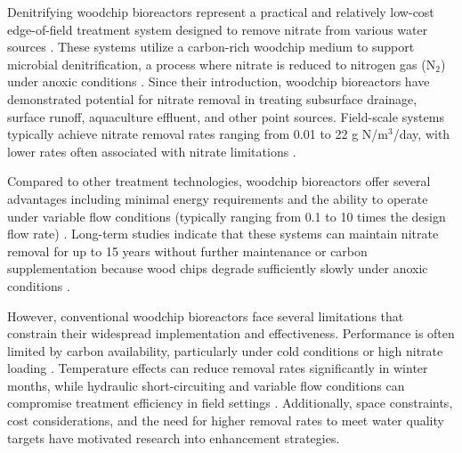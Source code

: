 \documentclass[12pt,a4paper]{article}
\begin{document}
Denitrifying woodchip bioreactors represent a practical and relatively low-cost edge-of-field treatment system designed to remove nitrate from various water sources \citep{RN625, RN310}. These systems utilize a carbon-rich woodchip medium to support microbial denitrification, a process where nitrate is reduced to nitrogen gas (N$_{2}$) under anoxic conditions \citep{RN242, RN629}.  Since their introduction, woodchip bioreactors have demonstrated potential for nitrate removal in treating subsurface drainage, surface runoff, aquaculture effluent, and other point sources. Field-scale systems typically achieve nitrate removal rates ranging from 0.01 to 22 g N/m$^3$/day, with lower rates often associated with nitrate limitations \citep{RN625, RN310}.

Compared to other treatment technologies, woodchip bioreactors offer several advantages including minimal energy requirements and the ability to operate under variable flow conditions (typically ranging from 0.1 to 10 times the design flow rate) \citep{RN625, RN310}.  Long-term studies indicate that these systems can maintain nitrate removal for up to 15 years without further maintenance or carbon supplementation because wood chips degrade sufficiently slowly under anoxic conditions \citep{RN625, RN629}.

However, conventional woodchip bioreactors face several limitations that constrain their widespread implementation and effectiveness. Performance is often limited by carbon availability, particularly under cold conditions or high nitrate loading \citep{RN625, RN228, RN258}.  Temperature effects can reduce removal rates significantly in winter months, while hydraulic short-circuiting and variable flow conditions can compromise treatment efficiency in field settings \citep{RN228, RN309}. Additionally, space constraints, cost considerations, and the need for higher removal rates to meet water quality targets have motivated research into enhancement strategies.
\end{document}
